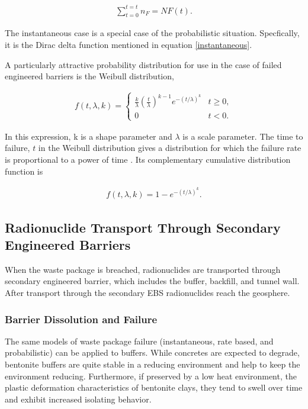 \begin{align}
  \sum_{t=0}^{t=t}n_F=NF(t).
  \label{cdf}
\end{align}

The instantaneous case is a special case of the probabilistic situation. 
Specfically, it is the Dirac delta function mentioned in equation 
\eqref{instantaneous}.

A particularly attractive probability distribution for use in the case of failed 
engineered barriers is the Weibull distribution, 

\begin{align}
  f(t,\lambda,k) =  \begin{cases}
    \frac{k}{\lambda}\left(\frac{t}{\lambda}\right)^{k-1}e^{-(t/\lambda)^{k}} & 
    t\geq0 ,\\
    0 & t<0 .\end{cases}
  \label{weibullpdf}
\end{align}


In this expression, k is a shape parameter and $\lambda$ is a scale
parameter. The time to failure, $t$ in the Weibull distribution gives a 
distribution for which the failure rate is proportional to a power of time 
\cite{papoulis_probability_2002}. Its complementary cumulative distribution
function is 

\begin{align}
  f(t,\lambda,k) = 1-e^{-(t/\lambda)^k}.
  \label{weibullcdf}
\end{align}



\subsection{Radionuclide Transport Through Secondary Engineered Barriers}

When the waste package is breached, radionuclides are transported through secondary 
engineered barrier, which includes the buffer, backfill, and tunnel wall. After 
transport through the secondary EBS radionuclides reach the geosphere. 

\subsubsection{Barrier Dissolution and Failure}

The same models of waste package failure (instantaneous, rate based, and 
probabilistic) can be applied to buffers. While concretes are expected to 
degrade, bentonite buffers are quite stable in a reducing environment and help 
to keep the environment reducing. Furthermore, if preserved by  a low heat 
environment, the plastic deformation characteristics of bentonite clays,
they tend to swell over time and exhibit increased isolating behavior.

